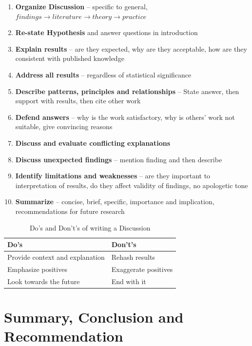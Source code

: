 \documentclass{article}
\begin{document}
\begin{enumerate}
    \item \textbf{Organize Discussion} -- specific to general, $findings \rightarrow literature \rightarrow theory \rightarrow practice$
    \item \textbf{Re-state Hypothesis} and answer questions in introduction
    \item \textbf{Explain results} -- are they expected, why are they acceptable, how are they consistent with published knowledge
    \item \textbf{Address all results} -- regardless of statistical significance
    \item \textbf{Describe patterns, principles and relationships} -- State answer, then support with results, then cite other work
    \item \textbf{Defend answers} -- why is the work satisfactory, why is others' work not suitable, give convincing reasons
    \item \textbf{Discuss and evaluate conflicting explanations}
    \item \textbf{Discuss unexpected findings} -- mention finding and then describe
    \item \textbf{Identify limitations and weaknesses} -- are they important to interpretation of results, do they affect validity of findings, no apologetic tone
    \item \textbf{Summarize} -- concise, brief, specific, importance and implication, recommendations for future research
\end{enumerate}

\begin{table}[h]
\centering
\begin{tabular}{|l|l|}
\hline
\textbf{Do's}                   & \textbf{Don't's}     \\ \hline
Provide context and explanation & Rehash results       \\ \hline
Emphasize positives             & Exaggerate positives \\ \hline
Look towards the future         & End with it          \\ \hline
\end{tabular}
\caption{Do's and Don't's of writing a Discussion}
\label{tab:dos-donts-discussion}
\end{table}

\section{Summary, Conclusion and Recommendation}
\end{document}
